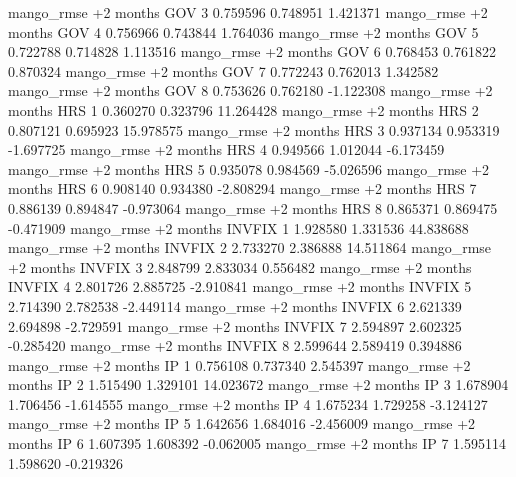 mango_rmse +2 months      GOV                 3 0.759596       0.748951           1.421371
mango_rmse +2 months      GOV                 4 0.756966       0.743844           1.764036
mango_rmse +2 months      GOV                 5 0.722788       0.714828           1.113516
mango_rmse +2 months      GOV                 6 0.768453       0.761822           0.870324
mango_rmse +2 months      GOV                 7 0.772243       0.762013           1.342582
mango_rmse +2 months      GOV                 8 0.753626       0.762180          -1.122308
mango_rmse +2 months      HRS                 1 0.360270       0.323796          11.264428
mango_rmse +2 months      HRS                 2 0.807121       0.695923          15.978575
mango_rmse +2 months      HRS                 3 0.937134       0.953319          -1.697725
mango_rmse +2 months      HRS                 4 0.949566       1.012044          -6.173459
mango_rmse +2 months      HRS                 5 0.935078       0.984569          -5.026596
mango_rmse +2 months      HRS                 6 0.908140       0.934380          -2.808294
mango_rmse +2 months      HRS                 7 0.886139       0.894847          -0.973064
mango_rmse +2 months      HRS                 8 0.865371       0.869475          -0.471909
mango_rmse +2 months   INVFIX                 1 1.928580       1.331536          44.838688
mango_rmse +2 months   INVFIX                 2 2.733270       2.386888          14.511864
mango_rmse +2 months   INVFIX                 3 2.848799       2.833034           0.556482
mango_rmse +2 months   INVFIX                 4 2.801726       2.885725          -2.910841
mango_rmse +2 months   INVFIX                 5 2.714390       2.782538          -2.449114
mango_rmse +2 months   INVFIX                 6 2.621339       2.694898          -2.729591
mango_rmse +2 months   INVFIX                 7 2.594897       2.602325          -0.285420
mango_rmse +2 months   INVFIX                 8 2.599644       2.589419           0.394886
mango_rmse +2 months       IP                 1 0.756108       0.737340           2.545397
mango_rmse +2 months       IP                 2 1.515490       1.329101          14.023672
mango_rmse +2 months       IP                 3 1.678904       1.706456          -1.614555
mango_rmse +2 months       IP                 4 1.675234       1.729258          -3.124127
mango_rmse +2 months       IP                 5 1.642656       1.684016          -2.456009
mango_rmse +2 months       IP                 6 1.607395       1.608392          -0.062005
mango_rmse +2 months       IP                 7 1.595114       1.598620          -0.219326
